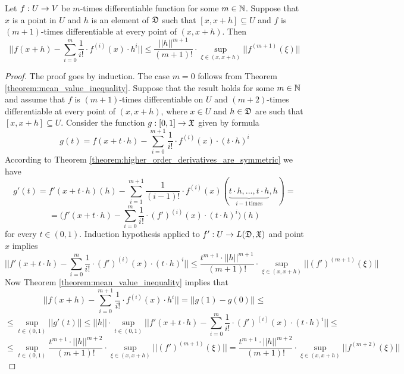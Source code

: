 \begin{theorem}\label{theorem:Taylors_inequality_with_Lagrange_remainder}
Let $f:U\rightarrow V$ be $m$-times differentiable function for some $m\in {\mathbb N}$. Suppose that $x$ is a point in $U$ and $h$ is an element of ${\mathfrak D}$ such that $[x,x+h] \subseteq U$ and $f$ is $(m+1)$-times differentiable at every point of $(x,x+h)$. Then 
$$\bigg|\bigg|f(x + h) - \sum_{i=0}^m\frac{1}{i!}\cdot f^{(i)}(x)\cdot h^i \bigg|\bigg| \leq \frac{||h||^{m+1}}{(m+1)!} \cdot \sup_{\xi \in (x,x+h)}||f^{(m+1)}(\xi)||$$
\end{theorem}
\begin{proof}
The proof goes by induction. The case $m = 0$ follows from Theorem \ref{theorem:mean_value_inequality}. Suppose that the result holds for some $m\in {\mathbb N}$ and assume that $f$ is $(m+1)$-times differentiable on $U$ and $(m+2)$-times differentiable at every point of $(x,x+h)$, where $x \in U$ and $h\in {\mathfrak D}$ are such that $[x,x+h]\subseteq U$. Consider the function $g:[0,1] \rightarrow {\mathfrak X}$ given by formula 
$$g(t) = f(x + t\cdot h) - \sum_{i=0}^{m+1}\frac{1}{i!}\cdot f^{(i)}(x)\cdot \left(t\cdot h\right)^i$$
According to Theorem \ref{theorem:higher_order_derivatives_are_symmetric} we have
$$g'(t) = f'(x + t\cdot h)(h) - \sum_{i=1}^{m+1}\frac{1}{(i-1)!}\cdot f^{(i)}(x)\left(\underbrace{t\cdot h,...,t\cdot h}_{i-1\,\mathrm{times}},h\right) =$$
$$= \bigg(f'(x + t\cdot h) - \sum_{i=0}^{m}\frac{1}{i!}\cdot \left(f'\right)^{(i)}(x)\cdot \left(t\cdot h\right)^i\bigg)(h)$$
for every $t \in (0,1)$. Induction hypothesis applied to $f':U\rightarrow L({\mathfrak D},{\mathfrak X})$ and point $x$ implies
$$\bigg|\bigg|f'(x + t\cdot h) - \sum_{i=0}^{m}\frac{1}{i!}\cdot \left(f'\right)^{(i)}(x)\cdot \left(t\cdot h\right)^i\bigg|\bigg| \leq \frac{t^{m+1}\cdot ||h||^{m+1}}{(m+1)!}\cdot \sup_{\xi \in (x,x+h)}\big|\big|\left(f'\right)^{(m+1)}(\xi)\big|\big|$$
Now Theorem \ref{theorem:mean_value_inequality} implies that
$$\bigg|\bigg|f(x + h) - \sum_{i=0}^{m+1}\frac{1}{i!}\cdot f^{(i)}(x)\cdot h^i \bigg|\bigg| = ||g(1) - g(0)|| \leq$$
$$\leq \sup_{t \in (0,1)}||g'(t)|| \leq ||h||\cdot  \sup_{t \in (0,1)}\bigg|\bigg|f'(x + t\cdot h) - \sum_{i=0}^{m}\frac{1}{i!}\cdot \left(f'\right)^{(i)}(x)\cdot \left(t\cdot h\right)^i\bigg|\bigg| \leq $$
$$\leq \sup_{t \in (0,1)}\frac{t^{m+1}\cdot ||h||^{m+2}}{(m+1)!} \cdot \sup_{\xi \in (x,x+h)}||\left(f'\right)^{(m+1)}(\xi)|| = \frac{t^{m+1}\cdot ||h||^{m+2}}{(m+1)!} \cdot \sup_{\xi \in (x,x+h)}||f^{(m+2)}(\xi)||$$
\end{proof}















